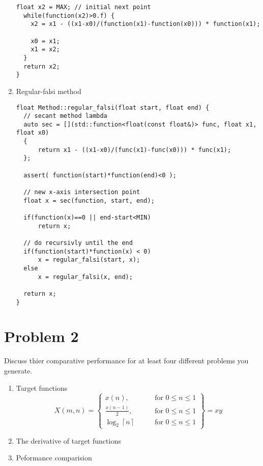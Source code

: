 \documentclass[12pt,letterpaper]{article}
\begin{document}
\begin{enumerate}
\begin{lstlisting}[style=C++]
  float x2 = MAX; // initial next point
  while(function(x2)>0.f) {
    x2 = x1 - ((x1-x0)/(function(x1)-function(x0))) * function(x1);
    
    x0 = x1; 
    x1 = x2;
  }
  return x2;
}
\end{lstlisting}

\newpage

\item Regular-falsi method
\begin{lstlisting}[style=C++]
float Method::regular_falsi(float start, float end) {
  // secant method lambda
  auto sec = [](std::function<float(const float&)> func, float x1, float x0)
  { 
      return x1 - ((x1-x0)/(func(x1)-func(x0))) * func(x1); 
  };

  assert( function(start)*function(end)<0 );

  // new x-axis intersection point
  float x = sec(function, start, end);

  if(function(x)==0 || end-start<MIN)
      return x;

  // do recursivly until the end
  if(function(start)*function(x) < 0)
      x = regular_falsi(start, x);
  else
      x = regular_falsi(x, end);

  return x;
}
\end{lstlisting}

\end{enumerate}

\newpage

\section*{Problem 2}

Discuss thier comparative performance for at least four different problems you generate.

\begin{enumerate}
\item Target functions
\begin{equation*}
  X(m,n) = \left\{\begin{array}{lr}
      x(n), & \text{for } 0\leq n\leq 1\\
      \frac{x(n-1)}{2}, & \text{for } 0\leq n\leq 1\\
      \log_2 \left\lceil n \right\rceil \qquad & \text{for } 0\leq n\leq 1
      \end{array}\right\} = xy
\end{equation*}

\item The derivative of target functions
\begin{equation*}
\end{equation*}

\item Peformance comparision

\end{enumerate}
\end{document}
